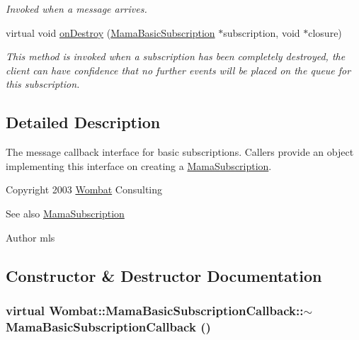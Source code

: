 \begin{DoxyCompactItemize}
\begin{DoxyCompactList}\small\item\em Invoked when a message arrives. \item\end{DoxyCompactList}\item 
virtual void \hyperlink{classWombat_1_1MamaBasicSubscriptionCallback_a9d6ab2f4870df2245d295d61fa204473}{onDestroy} (\hyperlink{classWombat_1_1MamaBasicSubscription}{MamaBasicSubscription} $\ast$subscription, void $\ast$closure)
\begin{DoxyCompactList}\small\item\em This method is invoked when a subscription has been completely destroyed, the client can have confidence that no further events will be placed on the queue for this subscription. \item\end{DoxyCompactList}\end{DoxyCompactItemize}


\subsection{Detailed Description}
The message callback interface for basic subscriptions. Callers provide an object implementing this interface on creating a {\ttfamily \hyperlink{classWombat_1_1MamaSubscription}{MamaSubscription}}.

Copyright 2003 \hyperlink{namespaceWombat}{Wombat} Consulting

\begin{DoxySeeAlso}{See also}
\hyperlink{classWombat_1_1MamaSubscription}{MamaSubscription} 
\end{DoxySeeAlso}
\begin{DoxyAuthor}{Author}
mls 
\end{DoxyAuthor}


\subsection{Constructor \& Destructor Documentation}
\hypertarget{classWombat_1_1MamaBasicSubscriptionCallback_ac9999ee1ad50f810758079b7c34e8ca5}{
\subsubsection[{$\sim$MamaBasicSubscriptionCallback}]{\setlength{\rightskip}{0pt plus 5cm}virtual Wombat::MamaBasicSubscriptionCallback::$\sim$MamaBasicSubscriptionCallback ()}}
\label{classWombat_1_1MamaBasicSubscriptionCallback_ac9999ee1ad50f810758079b7c34e8ca5}


